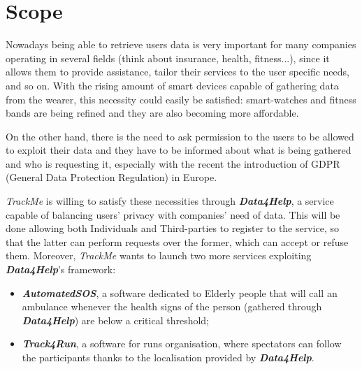 \section{Scope}
    Nowadays being able to retrieve users data is very important for many companies operating in several fields (think about insurance, health, fitness...), since it allows them to provide assistance, tailor their services to the user specific needs, and so on. With the rising amount of smart devices capable of gathering data from the wearer, this necessity could easily be satisfied: smart-watches and fitness bands are being refined and they are also becoming more affordable.
    
    On the other hand, there is the need to ask permission to the users to be allowed to exploit their data and they have to be informed about what is being gathered and who is requesting it, especially with the recent the introduction of GDPR (General Data Protection Regulation) in Europe.
    
    \emph{TrackMe} is willing to satisfy these necessities through \textbf{\emph{Data4Help}}, a service capable of balancing users' privacy with companies' need of data. This will be done allowing both Individuals and Third-parties to register to the service, so that the latter can perform requests over the former, which can accept or refuse them.
    Moreover, \emph{TrackMe} wants to launch two more services exploiting \textbf{\emph{Data4Help}}'s framework:
    \begin{itemize}
        \item \textbf{\emph{AutomatedSOS}}, a software dedicated to Elderly people that will call an ambulance whenever the health signs of the person (gathered through \textbf{\emph{Data4Help}}) are below a critical threshold;
        \item \textbf{\emph{Track4Run}}, a software for runs organisation, where spectators can follow the participants thanks to the localisation provided by \textbf{\emph{Data4Help}}.
    \end{itemize}